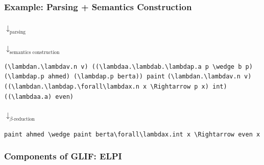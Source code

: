 \begin{frame}[fragile]
    \frametitle{Example: Parsing + Semantics Construction}
    \begin{autowidthenv}
    {\centering{}\par}\vspace{1em}
    \hspace{0.49\textwidth}$\downarrow_{\text{parsing}}$\par\vspace{1em}
    {\centering\color{logicfont!50!nlfont} \par}\vspace{1em}
    \hspace{0.49\textwidth}$\downarrow_{\text{semantics construction}}$\par\vspace{1em}
    {\centering\begin{adjustbox}{}\color{logicfont}\footnotesize\ifx\switchtomathexample\undefined
        \lstinline[language=MMT,basicstyle=\scriptsize\ttfamily]|(\lambdan.\lambdav.n v) ((\lambdaa.\lambdab.\lambdap.a p \wedge b p) (\lambdap.p ahmed) (\lambdap.p berta)) paint|\else
                    \lstinline[language=MMT]|(\lambdan.\lambdav.n v) ((\lambdan.\lambdap.\forall\lambdax.n x \Rightarrow p x) int) ((\lambdaa.a) even)|
                \fi
    \end{adjustbox}\par}\vspace{1em}
    \hspace{0.49\textwidth}$\downarrow_{\text{$\beta$-reduction}}$\par\vspace{1em}
{\centering\color{logicfont}\small\begin{adjustbox}{}\ifx\switchtomathexample\undefined\lstinline[language=MMT]|paint ahmed \wedge paint berta|\else\lstinline[language=MMT]|\forall\lambdax.int x \Rightarrow even x|\fi\end{adjustbox}\par}
    \end{autowidthenv}
\end{frame}


\begin{frame}
    \frametitle{Components of GLIF: ELPI}
    \autowidth{
    
    }
\end{frame}

